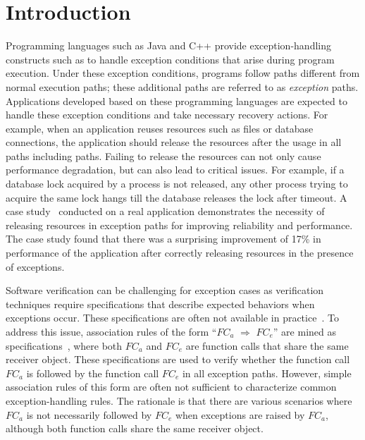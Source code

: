 \section{Introduction}
\label{sec:intro}
\vspace*{-3ex}
Programming languages such as Java and C++ provide exception-handling 
constructs such as  to handle exception conditions that arise
during program execution. Under these exception conditions, programs follow paths
different from normal execution paths; these additional paths are referred to as 
\emph{exception} paths. Applications developed based on these programming
languages are expected to handle these exception conditions and take necessary recovery
actions. For example, when an application reuses resources such as files or database connections,
the application should release the resources after the usage in all paths
including  paths. Failing to release the resources can not only cause performance degradation, 
but can also lead to critical issues. For example, if a database lock acquired by a
process is not released, any other process trying to acquire the same lock
hangs till the database releases the lock after timeout.
A case study~\cite{Weimer04} conducted on a real application 
demonstrates the necessity of releasing resources in exception paths 
for improving reliability and performance. 
The case study found that there was a surprising
improvement of 17\% in performance of the application after 
correctly releasing resources in the presence of exceptions.


Software verification can be challenging for exception cases as verification
techniques require specifications that describe expected behaviors when exceptions occur.
These specifications are often not available in practice~\cite{document:leth}.
To address this issue, association rules of the form ``$FC_a$ $\Rightarrow$ $FC_e$''
are mined as specifications~\cite{WeimerN05}, where both $FC_a$ and $FC_e$ are function calls that share
the same receiver object. These specifications are used to 
verify whether the function call $FC_a$ is followed by the function call $FC_e$ in all 
exception paths. However, simple association rules of this form are often not sufficient
to characterize common exception-handling rules. The rationale is that
there are various scenarios where $FC_a$ is not necessarily followed by $FC_e$ 
when exceptions are raised by $FC_a$, although both function calls 
share the same receiver object. 

